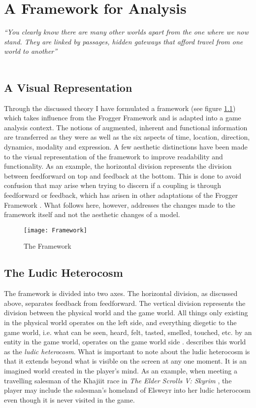 \chapter{A Framework for Analysis}
\textit{``You clearly know there are many other worlds apart from the one where we now stand. They are linked by passages, hidden gateways that afford travel from one world to another''} \\
 \\

\section{A Visual Representation}
Through the discussed theory I have formulated a framework (see figure \ref{framework}) which takes influence from the Frogger Framework \cite{frogger} and is adapted into a game analysis context. The notions of augmented, inherent and functional information are transferred as they were as well as the six aspects of time, location, direction, dynamics, modality and expression. A few aesthetic distinctions have been made to the visual representation of the framework to improve readability and functionality. As an example, the horizontal division represents the division between feedforward on top and feedback at the bottom. This is done to avoid confusion that may arise when trying to discern if a coupling is through feedforward or feedback, which has arisen in other adaptations of the Frogger Framework \cite{tangifrog}. What follows here, however, addresses the changes made to the framework itself and not the aesthetic changes of a model.

\begin{figure}
  \texttt{[image: Framework]}
  \caption{The Framework}
  \label{framework}
\end{figure}

\section{The Ludic Heterocosm}
The framework is divided into two axes. The horizontal division, as discussed above, separates feedback from feedforward. The vertical division represents the division between the physical world and the game world. All things only existing in the physical world operates on the left side, and everything diegetic to the game world, i.e. what can be seen, heard, felt, tasted, smelled, touched, etc. by an entity in the game world, operates on the game world side \cite{bordwell}.  describes this world as the \textit{ludic heterocosm}. What is important to note about the ludic heterocosm is that it extends beyond what is visible on the screen at any one moment. It is an imagined world created in the player's mind. As an example, when meeting a travelling salesman of the Khajiit race in \textit{The Elder Scrolls V: Skyrim} \cite{skyrim}, the player may include the salesman's homeland of Elsweyr into her ludic heterocosm even though it is never visited in the game.

